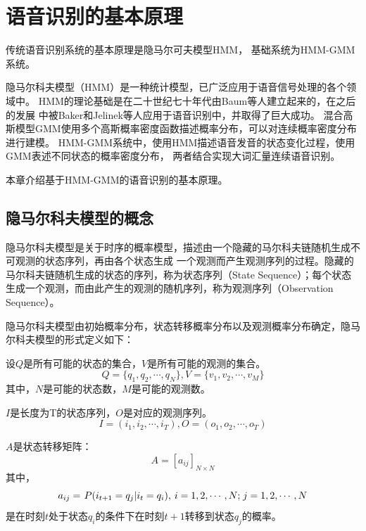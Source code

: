 ﻿%

\chapter{语音识别的基本原理}\label{intro_hmm}

传统语音识别系统的基本原理是隐马尔可夫模型HMM，
基础系统为HMM-GMM系统。

隐马尔科夫模型（HMM）是一种统计模型，已广泛应用于语音信号处理的各个领域中。
HMM的理论基础是在二十世纪七十年代由Baum等人建立起来的，在之后的发展
中被Baker和Jelinek等人应用于语音识别中，并取得了巨大成功。
混合高斯模型GMM使用多个高斯概率密度函数描述概率分布，可以对连续概率密度分布进行建模。
HMM-GMM系统中，使用HMM描述语音发音的状态变化过程，使用GMM表述不同状态的概率密度分布，
两者结合实现大词汇量连续语音识别。


本章介绍基于HMM-GMM的语音识别的基本原理。

%
\section{隐马尔科夫模型的概念}

    \begin{definition}[隐马尔科夫模型]
    \song 隐马尔科夫模型是关于时序的概率模型，描述由一个隐藏的马尔科夫链随机生成不可观测的状态序列，再由各个状态生成
    一个观测而产生观测序列的过程。隐藏的马尔科夫链随机生成的状态的序列，称为状态序列（State Sequence）；每个状态
    生成一个观测，而由此产生的观测的随机序列，称为观测序列（Observation Sequence）。
    \end{definition}

    隐马尔科夫模型由初始概率分布，状态转移概率分布以及观测概率分布确定，隐马尔科夫模型的形式定义如下：

    设$Q$是所有可能的状态的集合，$V$是所有可能的观测的集合。
    \[Q = \{ {q_1},{q_2},\cdots,{q_N}\} , V = \{ {v_1},{v_2},\cdots,{v_M}\} \]
    其中，$N$是可能的状态数，$M$是可能的观测数。

    $I$是长度为T的状态序列，$O$是对应的观测序列。
    \[I = ({i_1},{i_2},\cdots,{i_T}), O = ({o_1},{o_2},\cdots,{o_T})\]

    $A$是状态转移矩阵：
    \begin{equation}
    A = {\left[ {{a_{ij}}} \right]_{N \times N}}
    \end{equation}
    其中，
    \begin{equation}
    {a_{ij}} = {\kern 1pt} P({i_{t + 1}} = {q_j}|{i_t} = {q_i}),{\kern 1pt} {\kern 1pt} i = 1,2, \cdots ,N;{\kern 1pt} j = 1,2, \cdots ,N
    \end{equation}
    是在时刻$t$处于状态$q_i$的条件下在时刻$t+1$转移到状态$q_j$的概率。

